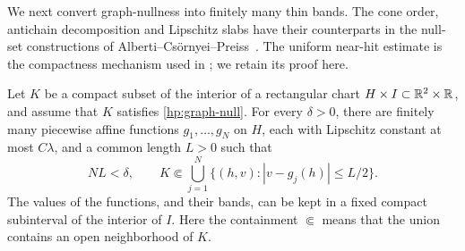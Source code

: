 We next convert graph-nullness into finitely many thin bands.  The
cone order, antichain decomposition and Lipschitz slabs have their
counterparts in the null-set constructions of
Alberti--Cs\"ornyei--Preiss~\cite[Sections~2.2 and~3]{AlbertiCsornyeiPreiss2010}.
The uniform near-hit estimate is the compactness mechanism used in
\cite[Lemma~4.12, Step~1]{AlbertiMarchese2016}; we retain its proof here.

\begin{lemma}\label{hp:thin-bands}
Let $K$ be a compact subset of the interior of a rectangular chart
$H\times I\subset\mathbb R^2\times\mathbb R$, and assume that $K$ satisfies
\eqref{hp:graph-null}.  For every $\delta>0$, there are finitely many
piecewise affine functions $g_1,\dots,g_N$ on $H$, each with
Lipschitz constant at most $C\lambda$, and a common length $L>0$
such that
\[
 NL<\delta,
 \qquad
 K\Subset\bigcup_{j=1}^N
       \{(h,v):|v-g_j(h)|\le L/2\}.
\]
The values of the functions, and their bands, can be kept in a fixed
compact subinterval of the interior of $I$.  Here the containment
$\Subset$ means that the union contains an open neighborhood of $K$.
\end{lemma}


